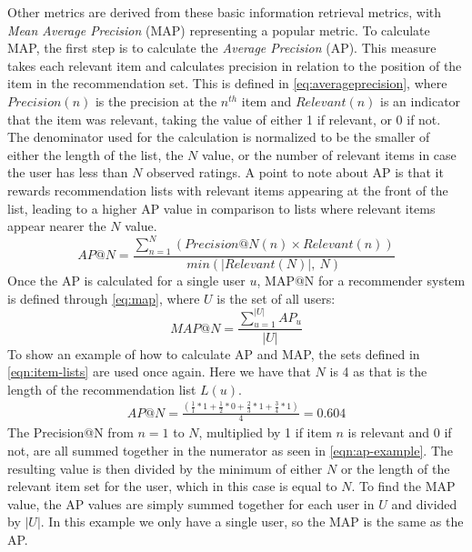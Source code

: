 Other metrics are derived from these basic information retrieval metrics, with \textit{Mean Average Precision} (MAP) representing a popular metric\cite{ChoosingMetricsEvaluation}.
To calculate MAP, the first step is to calculate the \textit{Average Precision} (AP).
This measure takes each relevant item and calculates precision in relation to the position of the item in the recommendation set.
This is defined in \cref{eq:averageprecision}, where $Precision(n)$ is the precision at the $n^{th}$ item and $Relevant(n)$ is an indicator that the item was relevant, taking the value of either 1 if relevant, or 0 if not.
The denominator used for the calculation is normalized to be the smaller of either the length of the list, the $N$ value, or the number of relevant items in case the user has less than $N$ observed ratings.
A point to note about AP is that it rewards recommendation lists with relevant items appearing at the front of the list, leading to a higher AP value in comparison to lists where relevant items appear nearer the $N$ value. 
\begin{equation}
    \label{eq:averageprecision}
    AP@N = \frac{\sum\limits_{n=1}^N (Precision@N(n) \times Relevant(n))}{min(|Relevant(N)|,\:N)}
\end{equation}
Once the AP is calculated for a single user $u$, MAP@N for a recommender system is defined through \cref{eq:map}, where $U$ is the set of all users: 
\begin{equation}
    \label{eq:map}
    MAP@N = \frac{\sum\limits_{u=1}^{|U|} AP_u}{|U|}
\end{equation}
To show an example of how to calculate AP and MAP, the sets defined in \cref{eqn:item-lists} are used once again.
Here we have that $N$ is 4 as that is the length of the recommendation list $L(u)$.
\begin{align}
    AP@N = \frac{(\frac{1}{1}*1+\frac{1}{2}*0+\frac{2}{3}*1+\frac{3}{4}*1)}{4} = 0.604 \label{eqn:ap-example}
\end{align}
The Precision@N from $n=1$ to $N$, multiplied by 1 if item $n$ is relevant and 0 if not, are all summed together in the numerator as seen in \cref{eqn:ap-example}.
The resulting value is then divided by the minimum of either $N$ or the length of the relevant item set for the user, which in this case is equal to $N$.
To find the MAP value, the AP values are simply summed together for each user in $U$ and divided by $|U|$.
In this example we only have a single user, so the MAP is the same as the AP.
\\\\
